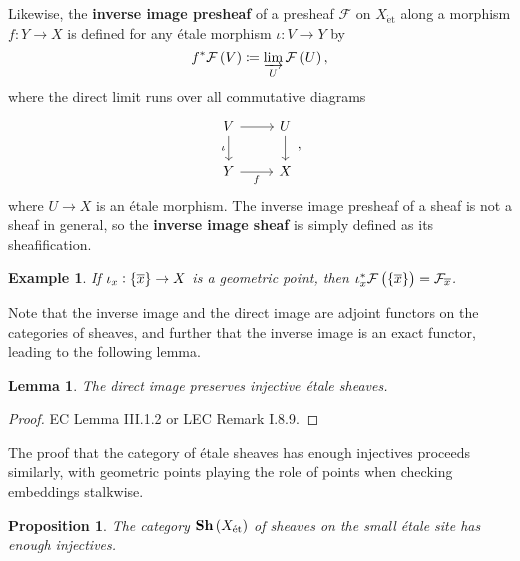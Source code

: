 \documentclass{article}
\newtheorem*{example}{Example}
\newtheorem*{lemma}{Lemma}
\newtheorem*{proposition}{Proposition}
\newcommand{\br}{\del}
\newcommand{\et}{\mathrm{\acute{e}t}}
\newcommand{\F}{\mathcal{F}}
\newcommand{\Sh}{\mathbf{Sh}}
\begin{document}
Likewise, the \textbf{inverse image presheaf} of a presheaf $ \F $ on $ X_\et $ along a morphism $ f : Y \to X $ is defined for any \'etale morphism $ \iota : V \to Y $ by
$$ f^*\F\br{V} \coloneqq \varinjlim_U \F\br{U}, $$
where the direct limit runs over all commutative diagrams
$$
\begin{tikzcd}
V \arrow{r} \arrow{d}[swap]{\iota} & U \arrow{d} \\
Y \arrow{r}[swap]{f} & X
\end{tikzcd},
$$
where $ U \to X $ is an \'etale morphism. The inverse image presheaf of a sheaf is not a sheaf in general, so the \textbf{inverse image sheaf} is simply defined as its sheafification.

\begin{example}
If $ \iota_x : \cbr{\overline{x}} \to X $ is a geometric point, then $ \iota_x^*\F\br{\cbr{\overline{x}}} = \F_{\overline{x}} $.
\end{example}

Note that the inverse image and the direct image are adjoint functors on the categories of sheaves, and further that the inverse image is an exact functor, leading to the following lemma.

\begin{lemma}
The direct image preserves injective \'etale sheaves.
\end{lemma}

\begin{proof}
EC Lemma III.1.2 or LEC Remark I.8.9.
\end{proof}

The proof that the category of \'etale sheaves has enough injectives proceeds similarly, with geometric points playing the role of points when checking embeddings stalkwise.

\begin{proposition}
The category $ \Sh\br{X_\et} $ of sheaves on the small \'etale site has enough injectives.
\end{proposition}
\end{document}
